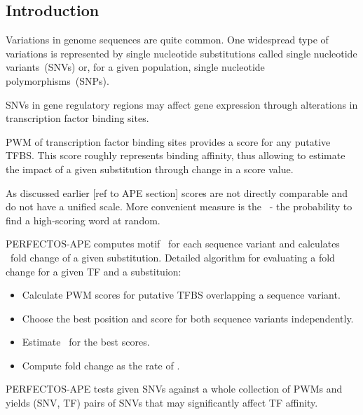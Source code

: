 \subsection{Introduction}
Variations in genome sequences are quite common. One widespread type of variations is represented by single nucleotide substitutions called single nucleotide variants~(SNVs) or, for a given population, single nucleotide polymorphisms~(SNPs).

SNVs in gene regulatory regions may affect gene expression through alterations in transcription factor binding sites.

PWM of transcription factor binding sites provides a score for any putative TFBS.
This score roughly represents binding affinity, thus allowing to estimate 
the impact of a given substitution through change in a score value.

As discussed earlier [ref to APE section] scores are not directly comparable and do not have a unified scale. More convenient measure is the \pvalue\ - the probability to find a high-scoring word at random.

PERFECTOS-APE computes motif \pvalues\ for each sequence variant and calculates \pvalue\ fold change of a given substitution. Detailed algorithm for evaluating a fold change for a given TF and a substituion:

\begin{itemize}
\item Calculate PWM scores for putative TFBS overlapping a sequence variant.
\item Choose the best position and score for both sequence variants independently.
\item Estimate \pvalues\ for the best scores.
\item Compute fold change as the rate of \pvalues.
\end{itemize}

PERFECTOS-APE tests given SNVs against a whole collection of PWMs and yields (SNV, TF) pairs of SNVs that may significantly affect TF affinity.
